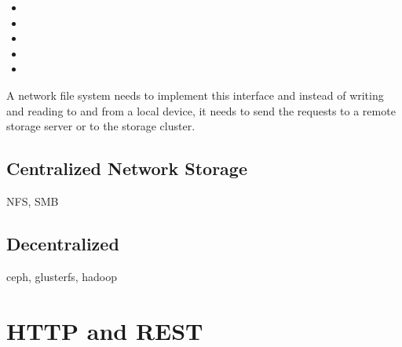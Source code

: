 \begin{itemize}
	\item {} 
	\item {} 
	\item {} 
	\item {} 
	\item {} 
\end{itemize} 

A network file system needs to implement this interface and instead of writing and reading to and from a local device, it needs to send the requests to a remote storage server or to the storage cluster.


\subsection{Centralized Network Storage}

NFS, SMB

\subsection{Decentralized}

ceph, glusterfs, hadoop



\section{HTTP and REST}
